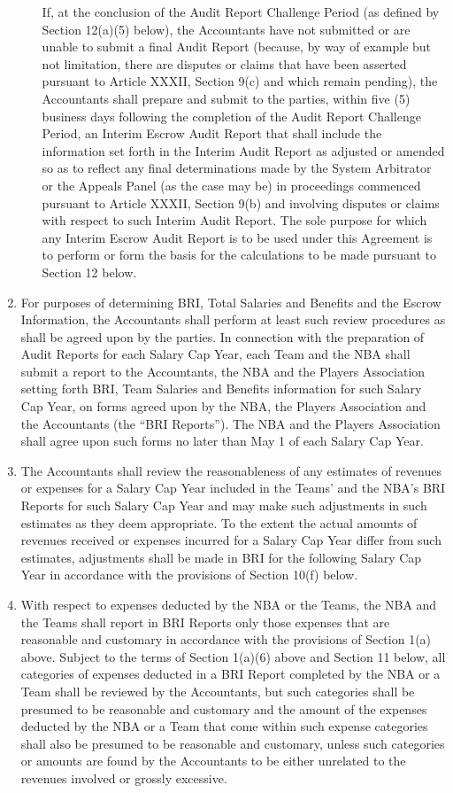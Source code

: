 \documentclass[
]{book}
\begin{document}
\begin{enumerate}
\begin{enumerate}
    If, at the conclusion of the Audit Report Challenge Period (as defined by Section 12(a)(5) below), the Accountants have not submitted or are unable to submit a final Audit Report (because, by way of example but not limitation, there are disputes or claims that have been asserted pursuant to Article XXXII, Section 9(c) and which remain pending), the Accountants shall prepare and submit to the parties, within five (5) business days following the completion of the Audit Report Challenge Period, an Interim Escrow Audit Report that shall include the information set forth in the Interim Audit Report as adjusted or amended so as to reflect any final determinations made by the System Arbitrator or the Appeals Panel (as the case may be) in proceedings commenced pursuant to Article XXXII, Section 9(b) and involving disputes or claims with respect to such Interim Audit Report. The sole purpose for which any Interim Escrow Audit Report is to be used under this Agreement is to perform or form the basis for the calculations to be made pursuant to Section 12 below.
  \end{enumerate}
\item
  For purposes of determining BRI, Total Salaries and Benefits and the Escrow Information, the Accountants shall perform at least such review procedures as shall be agreed upon by the parties. In connection with the preparation of Audit Reports for each Salary Cap Year, each Team and the NBA shall submit a report to the Accountants, the NBA and the Players Association setting forth BRI, Team Salaries and Benefits information for such Salary Cap Year, on forms agreed upon by the NBA, the Players Association and the Accountants (the ``BRI Reports''). The NBA and the Players Association shall agree upon such forms no later than May 1 of each Salary Cap Year.
\item
  The Accountants shall review the reasonableness of any estimates of revenues or expenses for a Salary Cap Year included in the Teams' and the NBA's BRI Reports for such Salary Cap Year and may make such adjustments in such estimates as they deem appropriate. To the extent the actual amounts of revenues received or expenses incurred for a Salary Cap Year differ from such estimates, adjustments shall be made in BRI for the following Salary Cap Year in accordance with the provisions of Section 10(f) below.
\item
  With respect to expenses deducted by the NBA or the Teams, the NBA and the Teams shall report in BRI Reports only those expenses that are reasonable and customary in accordance with the provisions of Section 1(a) above. Subject to the terms of Section 1(a)(6) above and Section 11 below, all categories of expenses deducted in a BRI Report completed by the NBA or a Team shall be reviewed by the Accountants, but such categories shall be presumed to be reasonable and customary and the amount of the expenses deducted by the NBA or a Team that come within such expense categories shall also be presumed to be reasonable and customary, unless such categories or amounts are found by the Accountants to be either unrelated to the revenues involved or grossly excessive.

\end{enumerate}
\end{document}
